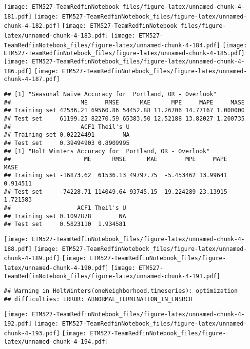 \documentclass[]{article}
\begin{document}
\texttt{[image: ETM527-TeamRedfinNotebook\_files/figure-latex/unnamed-chunk-4-181.pdf]}
\texttt{[image: ETM527-TeamRedfinNotebook\_files/figure-latex/unnamed-chunk-4-182.pdf]}
\texttt{[image: ETM527-TeamRedfinNotebook\_files/figure-latex/unnamed-chunk-4-183.pdf]}
\texttt{[image: ETM527-TeamRedfinNotebook\_files/figure-latex/unnamed-chunk-4-184.pdf]}
\texttt{[image: ETM527-TeamRedfinNotebook\_files/figure-latex/unnamed-chunk-4-185.pdf]}
\texttt{[image: ETM527-TeamRedfinNotebook\_files/figure-latex/unnamed-chunk-4-186.pdf]}
\texttt{[image: ETM527-TeamRedfinNotebook\_files/figure-latex/unnamed-chunk-4-187.pdf]}

\begin{verbatim}
## [1] "Seasonal Naive Accuracy for  Portland, OR - Overlook"
##                    ME     RMSE      MAE      MPE     MAPE     MASE
## Training set 42536.21 69560.86 54452.88 11.26706 14.77167 1.000000
## Test set     61199.25 82270.59 65383.50 12.52188 13.82027 1.200735
##                    ACF1 Theil's U
## Training set 0.02224491        NA
## Test set     0.39494903 0.8909995
## [1] "Holt Winters Accuracy for  Portland, OR - Overlook"
##                     ME      RMSE      MAE        MPE     MAPE     MASE
## Training set -16873.62  61536.13 49797.75  -5.453462 13.99641 0.914511
## Test set     -74228.71 114049.64 93745.15 -19.224289 23.13915 1.721583
##                   ACF1 Theil's U
## Training set 0.1097878        NA
## Test set     0.5823110  1.934581
\end{verbatim}

\texttt{[image: ETM527-TeamRedfinNotebook\_files/figure-latex/unnamed-chunk-4-188.pdf]}
\texttt{[image: ETM527-TeamRedfinNotebook\_files/figure-latex/unnamed-chunk-4-189.pdf]}
\texttt{[image: ETM527-TeamRedfinNotebook\_files/figure-latex/unnamed-chunk-4-190.pdf]}
\texttt{[image: ETM527-TeamRedfinNotebook\_files/figure-latex/unnamed-chunk-4-191.pdf]}

\begin{verbatim}
## Warning in HoltWinters(oneNeighborhood.timeseries): optimization
## difficulties: ERROR: ABNORMAL_TERMINATION_IN_LNSRCH
\end{verbatim}

\texttt{[image: ETM527-TeamRedfinNotebook\_files/figure-latex/unnamed-chunk-4-192.pdf]}
\texttt{[image: ETM527-TeamRedfinNotebook\_files/figure-latex/unnamed-chunk-4-193.pdf]}
\texttt{[image: ETM527-TeamRedfinNotebook\_files/figure-latex/unnamed-chunk-4-194.pdf]}
\end{document}
